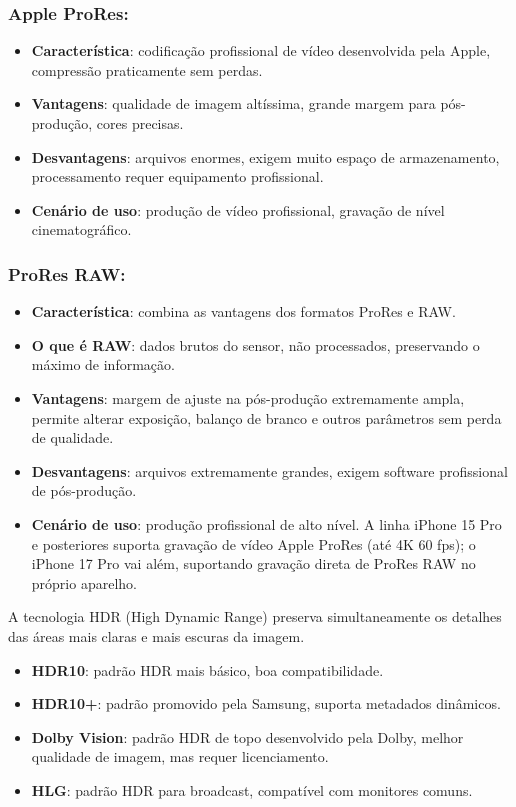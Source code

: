 \subsubsection*{Apple ProRes:}

\begin{itemize}
  \item \textbf{Característica}: codificação profissional de vídeo desenvolvida pela Apple, compressão praticamente sem perdas.
  \item \textbf{Vantagens}: qualidade de imagem altíssima, grande margem para pós-produção, cores precisas.
  \item \textbf{Desvantagens}: arquivos enormes, exigem muito espaço de armazenamento, processamento requer equipamento profissional.
  \item \textbf{Cenário de uso}: produção de vídeo profissional, gravação de nível cinematográfico.
\end{itemize}

\subsubsection*{ProRes RAW:}

\begin{itemize}
  \item \textbf{Característica}: combina as vantagens dos formatos ProRes e RAW.
  \item \textbf{O que é RAW}: dados brutos do sensor, não processados, preservando o máximo de informação.
  \item \textbf{Vantagens}: margem de ajuste na pós-produção extremamente ampla, permite alterar exposição, balanço de branco e outros parâmetros sem perda de qualidade.
  \item \textbf{Desvantagens}: arquivos extremamente grandes, exigem software profissional de pós-produção.
  \item \textbf{Cenário de uso}: produção profissional de alto nível. A linha iPhone 15 Pro e posteriores suporta gravação de vídeo Apple ProRes (até 4K 60 fps); o iPhone 17 Pro vai além, suportando gravação direta de ProRes RAW no próprio aparelho.
\end{itemize}


A tecnologia HDR (High Dynamic Range) preserva simultaneamente os detalhes das áreas mais claras e mais escuras da imagem.

\begin{itemize}
  \item \textbf{HDR10}: padrão HDR mais básico, boa compatibilidade.
  \item \textbf{HDR10+}: padrão promovido pela Samsung, suporta metadados dinâmicos.
  \item \textbf{Dolby Vision}: padrão HDR de topo desenvolvido pela Dolby, melhor qualidade de imagem, mas requer licenciamento.
  \item \textbf{HLG}: padrão HDR para broadcast, compatível com monitores comuns.
\end{itemize}


